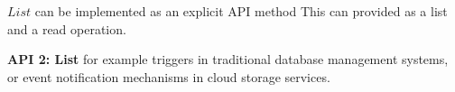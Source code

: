 $List$ can be implemented as an explicit API method This can provided as a list and a read operation.

\noindent
\textbf{API 2: List}
  for example triggers in traditional
  database management systems, or event notification mechanisms in cloud storage services.



















